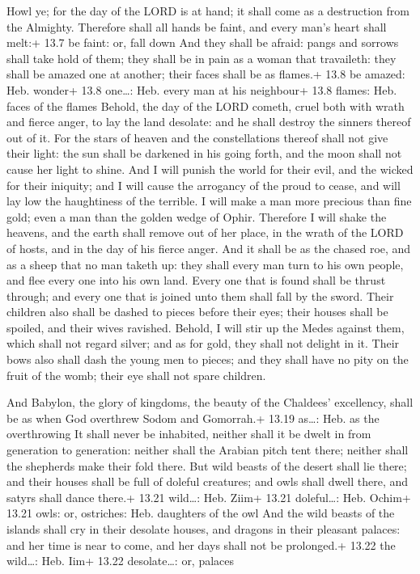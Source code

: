  Howl ye; for the day of the LORD is at hand; it shall
come as a destruction from the Almighty.  Therefore shall
all hands be faint, and every man's heart shall melt:+ 13.7 be faint:
or, fall down  And they shall be afraid: pangs and sorrows
shall take hold of them; they shall be in pain as a woman that
travaileth: they shall be amazed one at another; their faces shall be as
flames.+ 13.8 be amazed: Heb. wonder+ 13.8 one\ldots: Heb. every man at
his neighbour+ 13.8 flames: Heb. faces of the flames 
Behold, the day of the LORD cometh, cruel both with wrath and fierce
anger, to lay the land desolate: and he shall destroy the sinners
thereof out of it.  For the stars of heaven and the
constellations thereof shall not give their light: the sun shall be
darkened in his going forth, and the moon shall not cause her light to
shine.  And I will punish the world for their evil, and the
wicked for their iniquity; and I will cause the arrogancy of the proud
to cease, and will lay low the haughtiness of the terrible.
 I will make a man more precious than fine gold; even a man
than the golden wedge of Ophir.  Therefore I will shake the
heavens, and the earth shall remove out of her place, in the wrath of
the LORD of hosts, and in the day of his fierce anger.  And
it shall be as the chased roe, and as a sheep that no man taketh up:
they shall every man turn to his own people, and flee every one into his
own land.  Every one that is found shall be thrust through;
and every one that is joined unto them shall fall by the sword.
 Their children also shall be dashed to pieces before their
eyes; their houses shall be spoiled, and their wives ravished.
 Behold, I will stir up the Medes against them, which shall
not regard silver; and as for gold, they shall not delight in it.
 Their bows also shall dash the young men to pieces; and
they shall have no pity on the fruit of the womb; their eye shall not
spare children.

 And Babylon, the glory of kingdoms, the beauty of the
Chaldees' excellency, shall be as when God overthrew Sodom and
Gomorrah.+ 13.19 as\ldots: Heb. as the overthrowing  It
shall never be inhabited, neither shall it be dwelt in from generation
to generation: neither shall the Arabian pitch tent there; neither shall
the shepherds make their fold there.  But wild beasts of
the desert shall lie there; and their houses shall be full of doleful
creatures; and owls shall dwell there, and satyrs shall dance there.+
13.21 wild\ldots: Heb. Ziim+ 13.21 doleful\ldots: Heb. Ochim+ 13.21
owls: or, ostriches: Heb. daughters of the owl  And the
wild beasts of the islands shall cry in their desolate houses, and
dragons in their pleasant palaces: and her time is near to come, and her
days shall not be prolonged.+ 13.22 the wild\ldots: Heb. Iim+ 13.22
desolate\ldots: or, palaces

